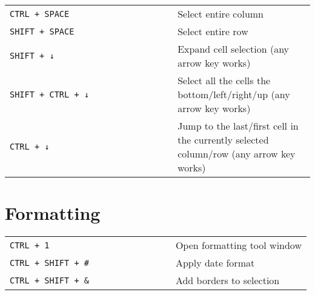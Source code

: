 \documentclass[8pt]{extarticle} %
\begin{document}
\begin{multicols}{2}
\begin{tabular}{L{0.55\linewidth} L{0.45\linewidth}}
    \tt CTRL + SPACE            & Select entire column \\
    \tt SHIFT + SPACE           & Select entire row \\
    \tt SHIFT + ↓               & Expand cell selection (any arrow key works) \\
    \tt SHIFT + CTRL + ↓        & Select all the cells the bottom/left/right/up (any arrow key works) \\
    \tt CTRL + ↓                & Jump to the last/first cell in the currently selected column/row (any arrow key works) \\

  \end{tabular}


\section{Formatting}

  \begin{tabular}{L{0.55\linewidth} L{0.45\linewidth}}
    
    \tt CTRL + 1                & Open formatting tool window \\
    \tt CTRL + SHIFT + \#        & Apply date format \\
    \tt CTRL + SHIFT + \&       & Add borders to selection \\
    
  \end{tabular}


\end{multicols}
\end{document}
